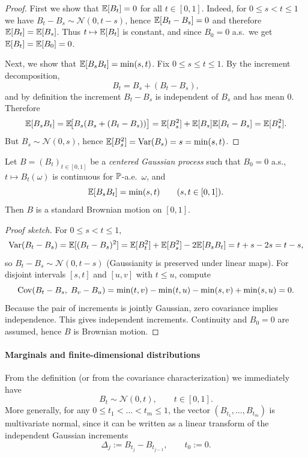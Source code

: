 \begin{proof}
First we show that $\mathbb{E}[B_t]=0$ for all $t\in[0,1]$.
Indeed, for $0\le s<t\le 1$ we have $B_t-B_s\sim\mathcal N(0,t-s)$, hence
$\mathbb{E}[B_t-B_s]=0$ and therefore $\mathbb{E}[B_t]=\mathbb{E}[B_s]$.
Thus $t\mapsto \mathbb{E}[B_t]$ is constant, and since $B_0=0$ a.s.\ we get
$\mathbb{E}[B_t]=\mathbb{E}[B_0]=0$.


Next, we show that $\mathbb{E}[B_sB_t]=\min(s,t)$. Fix $0\le s\le t\le 1$. By the increment decomposition,
\[
B_t = B_s + (B_t-B_s),
\]
and by definition the increment $B_t-B_s$ is independent of $B_s$ and has mean $0$.
Therefore
\[
\mathbb{E}[B_sB_t]
=\mathbb{E}\!\big[B_s(B_s+(B_t-B_s))\big]
=\mathbb{E}[B_s^2] + \mathbb{E}[B_s]\mathbb{E}[B_t-B_s]
=\mathbb{E}[B_s^2].
\]
But $B_s\sim\mathcal N(0,s)$, hence $\mathbb{E}[B_s^2]=\mathrm{Var}(B_s)=s=\min(s,t)$.
\end{proof}

\begin{proposition}
Let $B=(B_t)_{t\in[0,1]}$ be a \emph{centered Gaussian process} such that $B_0=0$ a.s.,
$t\mapsto B_t(\omega)$ is continuous for $\mathbb{P}$-a.e.\ $\omega$, and
\[
\mathbb{E}[B_sB_t]=\min(s,t)\qquad (s,t\in[0,1]).
\]
Then $B$ is a standard Brownian motion on $[0,1]$.
\end{proposition}

\begin{proof}[Proof sketch]
For $0\le s<t\le 1$,
\[
\mathrm{Var}(B_t-B_s)
=\mathbb{E}[(B_t-B_s)^2]
=\mathbb{E}[B_t^2]+\mathbb{E}[B_s^2]-2\mathbb{E}[B_sB_t]
=t+s-2s=t-s,
\]
so $B_t-B_s\sim\mathcal N(0,t-s)$ (Gaussianity is preserved under linear maps).
For disjoint intervals $[s,t]$ and $[u,v]$ with $t\le u$, compute
\[
\mathrm{Cov}(B_t-B_s,\;B_v-B_u)
=\min(t,v)-\min(t,u)-\min(s,v)+\min(s,u)=0.
\]
Because the pair of increments is jointly Gaussian, zero covariance implies
independence. This gives independent increments. Continuity and $B_0=0$ are assumed,
hence $B$ is Brownian motion.
\end{proof}

\paragraph{Marginals and finite-dimensional distributions}
From the definition (or from the covariance characterization) we immediately have
\[
B_t \sim \mathcal N(0,t),\qquad t\in[0,1].
\]
More generally, for any $0\le t_1<\dots<t_m\le 1$, the vector
$(B_{t_1},\dots,B_{t_m})$ is multivariate normal, since it can be written as a linear
transform of the independent Gaussian increments
\[
\Delta_j := B_{t_j}-B_{t_{j-1}},\qquad t_0:=0.
\]

